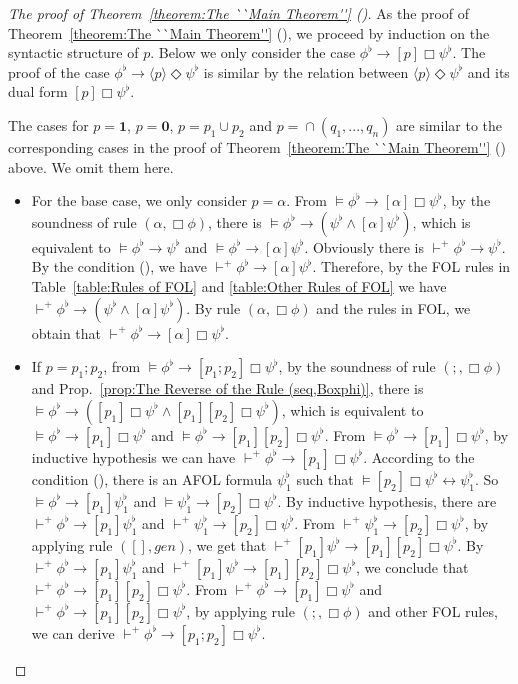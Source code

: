 \documentclass{fcs}
\newcommand{\la}[0]{\langle}
\newcommand{\ra}[0]{\rangle}
\newcommand{\rmn}[1]{(\romannumeral#1)}
\newcommand{\noth}[0]{\mathbf{1}}
\newcommand{\halt}[0]{\mathbf{0}}
\DeclareMathOperator{\seq}{;}
\DeclareMathOperator{\para}{\cap}
\newcommand{\reld}[0]{\mathit{\vdash^+}}
\begin{document}
\begin{proof}[The proof of Theorem~\ref{theorem:The ``Main Theorem''} \rmn{4}]
    As the proof of Theorem~\ref{theorem:The ``Main Theorem''} \rmn{2}, we proceed by induction on the syntactic structure of $p$.
    Below we only consider the case $\phi^\flat\to [p]\Box\psi^\flat$.
    The proof of the case $\phi^\flat\to \la p\ra \Diamond\psi^\flat$ is similar by the relation between $\la p\ra \Diamond\psi^\flat$ and its dual form $[p]\Box\psi^\flat$.

    The cases for $p=\noth$, $p=\halt$, $p=p_1\cup p_2$ and $p=\para(q_1,...,q_n)$ are similar to the corresponding cases in the proof of Theorem~\ref{theorem:The ``Main Theorem''} \rmn{2} above.
    We omit them here.

    \begin{itemize}
    \item For the base case, we only consider $p=\alpha$.
    From $\models \phi^\flat \to [\alpha]\Box\psi^\flat$, by the soundness of rule $(\alpha, \Box\phi)$, there is $\models \phi^\flat\to (\psi^\flat\wedge [\alpha]\psi^\flat)$, which is equivalent to
    $\models \phi^\flat\to \psi^\flat$ and $\models \phi^\flat\to [\alpha]\psi^\flat$.
    Obviously there is $\reld \phi^\flat\to \psi^\flat$.
    By the condition \rmn{2}, we have $\reld \phi^\flat\to [\alpha]\psi^\flat$.
    Therefore, by the FOL rules in Table~\ref{table:Rules of FOL} and \ref{table:Other Rules of FOL} we have $\reld \phi^\flat \to (\psi^\flat\wedge [\alpha]\psi^\flat)$.
    By rule $(\alpha, \Box\phi)$ and the rules in FOL, we obtain that $\reld \phi^\flat\to [\alpha]\Box\psi^\flat$.

    \item If $p=p_1\seq p_2$, from $\models \phi^\flat \to [p_1\seq p_2]\Box\psi^\flat$, by the soundness of rule $(\seq, \Box\phi)$ and Prop.~\ref{prop:The Reverse of the Rule (seq,Boxphi)}, there is $\models \phi^\flat\to ([p_1]\Box\psi^\flat\wedge [p_1][p_2]\Box\psi^\flat)$,
    which is equivalent to $\models \phi^\flat \to [p_1]\Box\psi^\flat$ and $\models \phi^\flat\to [p_1][p_2]\Box\psi^\flat$.
    From $\models \phi^\flat \to [p_1]\Box\psi^\flat$, by inductive hypothesis we can have $\reld \phi^\flat \to [p_1]\Box\psi^\flat$.
    According to the condition \rmn{1}, there is an AFOL formula $\psi^\flat_1$ such that $\models [p_2]\Box\psi^\flat \leftrightarrow \psi^\flat_1$.
    So $\models \phi^\flat\to [p_1]\psi^\flat_1$ and $\models \psi^\flat_1 \to [p_2]\Box\psi^\flat$.
    By inductive hypothesis, there are $\reld \phi^\flat\to [p_1]\psi^\flat_1$ and $\reld \psi^\flat_1 \to [p_2]\Box\psi^\flat$.
    From $\reld \psi^\flat_1 \to [p_2]\Box\psi^\flat$, by applying rule $([],\mathit{gen})$, we get that $\reld [p_1]\psi^\flat\to [p_1][p_2]\Box\psi^\flat$.
    By $\reld \phi^\flat\to [p_1]\psi^\flat_1$ and $\reld [p_1]\psi^\flat\to [p_1][p_2]\Box\psi^\flat$, we conclude that $\reld \phi^\flat\to [p_1][p_2]\Box\psi^\flat$.
    From $\reld \phi^\flat \to [p_1]\Box\psi^\flat$ and $\reld \phi^\flat\to [p_1][p_2]\Box\psi^\flat$, by applying rule $(\seq, \Box\phi)$ and other FOL rules, we can derive $\reld \phi^\flat\to [p_1\seq p_2]\Box\psi^\flat$.


\end{itemize}
\end{proof}
\end{document}

